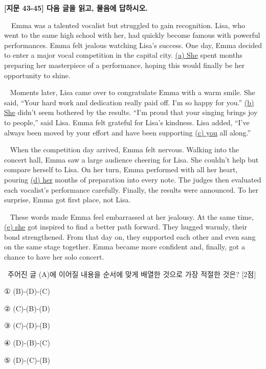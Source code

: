 \documentclass[11pt,a4paper]{article}
\newcommand{\qno}[1]{\par\vspace{8pt}\noindent{\sffamily\bfseries #1.}\ }
\newcommand{\instr}[1]{{\sffamily #1}\par\vspace{3pt}}
\newcommand{\secl}[1]{\par\vspace{5pt}\noindent{\sffamily\bfseries #1}\ }
\begin{document}
\begin{center}
{\fontsize{15}{17}\selectfont\sffamily\bfseries [지문 43-45] 다음 글을 읽고, 물음에 답하시오.}
\end{center}
\vspace{4pt}

\begin{pbox}
\ \
Emma was a talented vocalist but struggled to gain recognition. Lisa, who went to the
same high school with her, had quickly become famous with powerful performances. Emma
felt jealous watching Lisa's success. One day, Emma decided to enter a major vocal
competition in the capital city. \underline{(a) She} spent months preparing her masterpiece
of a performance, hoping this would finally be her opportunity to shine.
\end{pbox}

\secl{(B)}
Moments later, Lisa came over to congratulate Emma with a warm smile. She said, ``Your
hard work and dedication really paid off. I'm so happy for you.'' \underline{(b) She} didn't
seem bothered by the results. ``I'm proud that your singing brings joy to people,'' said
Lisa. Emma felt grateful for Lisa's kindness. Lisa added, ``I've always been moved by your
effort and have been supporting \underline{(c) you} all along.''

\secl{(C)}
When the competition day arrived, Emma felt nervous. Walking into the concert hall, Emma
saw a large audience cheering for Lisa. She couldn't help but compare herself to Lisa. On
her turn, Emma performed with all her heart, pouring \underline{(d) her} months of
preparation into every note. The judges then evaluated each vocalist's performance
carefully. Finally, the results were announced. To her surprise, Emma got first place, not
Lisa.

\secl{(D)}
These words made Emma feel embarrassed at her jealousy. At the same time, \underline{(e) she}
got inspired to find a better path forward. They hugged warmly, their bond strengthened.
From that day on, they supported each other and even sang on the same stage together. Emma
became more confident and, finally, got a chance to have her solo concert.

\vspace{4pt}

\qno{1}\instr{주어진 글 (A)에 이어질 내용을 순서에 맞게 배열한 것으로 가장 적절한 것은? [2점]}
\begin{choices}
\item ① (B)-(D)-(C)
\item ② (C)-(B)-(D)
\item ③ (C)-(D)-(B)
\item ④ (D)-(B)-(C)
\item ⑤ (D)-(C)-(B)
\end{choices}
\end{document}
